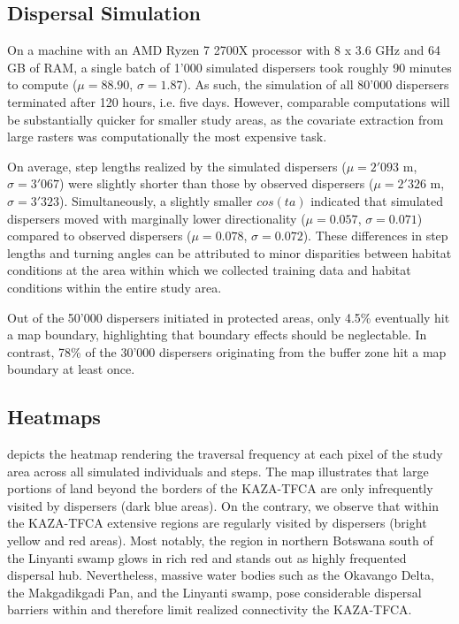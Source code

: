 \documentclass[abstract=on,10pt,a4paper,bibliography=totocnumbered]{article}
\begin{document}
\subsection{Dispersal Simulation}
On a machine with an AMD Ryzen 7 2700X processor with 8 x 3.6 GHz and 64 GB of
RAM, a single batch of 1'000 simulated dispersers took roughly 90 minutes to
compute (\(\mu = 88.90\), \(\sigma = 1.87\)). As such, the simulation of all
80'000 dispersers terminated after 120 hours, i.e. five days. However,
comparable computations will be substantially quicker for smaller study areas,
as the covariate extraction from large rasters was computationally the most
expensive task.

On average, step lengths realized by the simulated dispersers (\(\mu = 2'093\)
m, \(\sigma = 3'067\)) were slightly shorter than those by observed dispersers
(\(\mu = 2'326\) m, \(\sigma = 3'323\)). Simultaneously, a slightly smaller
\(cos(ta)\) indicated that simulated dispersers moved with marginally lower
directionality (\(\mu = 0.057\), \(\sigma = 0.071\)) compared to observed
dispersers (\(\mu = 0.078\), \(\sigma = 0.072\)). These differences in step
lengths and turning angles can be attributed to minor disparities between
habitat conditions at the area within which we collected training data and
habitat conditions within the entire study area.

Out of the 50'000 dispersers initiated in protected areas, only 4.5\% eventually
hit a map boundary, highlighting that boundary effects should be neglectable. In
contrast, 78\% of the 30'000 dispersers originating from the buffer zone hit a
map boundary at least once.

\subsection{Heatmaps}
 depicts the heatmap rendering the traversal frequency at each
pixel of the study area across all simulated individuals and steps. The map
illustrates that large portions of land beyond the borders of the KAZA-TFCA are
only infrequently visited by dispersers (dark blue areas). On the contrary, we
observe that within the KAZA-TFCA extensive regions are regularly visited by
dispersers (bright yellow and red areas). Most notably, the region in northern
Botswana south of the Linyanti swamp glows in rich red and stands out as highly
frequented dispersal hub. Nevertheless, massive water bodies such as the
Okavango Delta, the Makgadikgadi Pan, and the Linyanti swamp, pose considerable
dispersal barriers within and therefore limit realized connectivity the
KAZA-TFCA.
\end{document}
